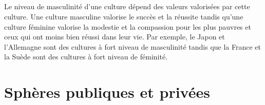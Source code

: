 \paragraph{}
Le niveau de masculinité d’une culture dépend des valeurs valorisées par cette culture. Une culture masculine valorise le succès et la réussite tandis qu’une culture féminine valorise la modestie et la compassion pour les plus pauvres et ceux qui ont moins bien réussi dans leur vie. Par exemple, le Japon et l’Allemagne sont des cultures à fort niveau de masculinité tandis que la France et la Suède sont des cultures à fort niveau de féminité. 

\chapter{Sphères publiques et privées}